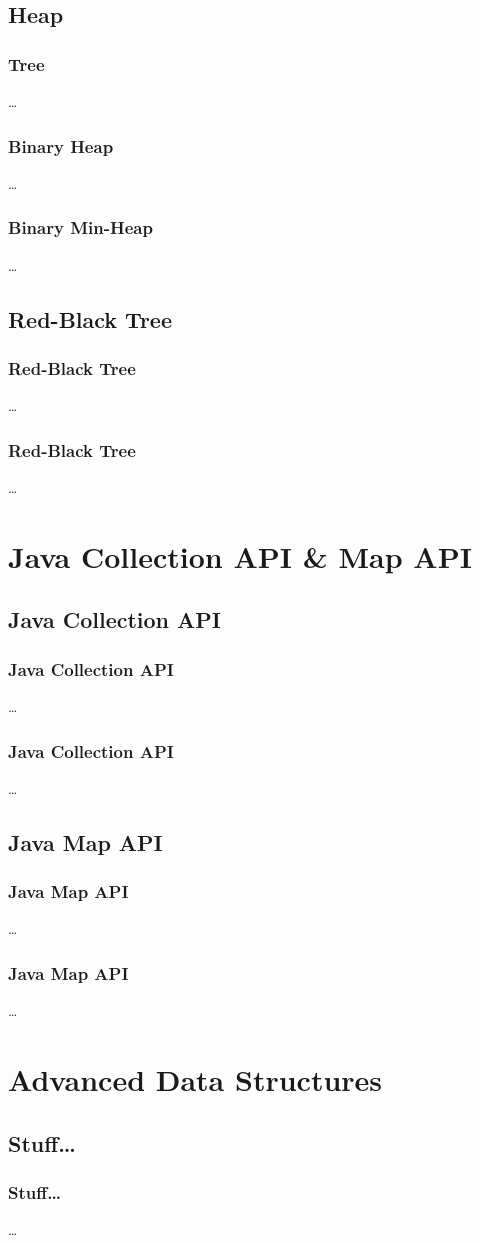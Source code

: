\documentclass{beamer}
\begin{document}
\subsection{Heap}

\begin{frame}
	\frametitle{Tree}
	\ldots
\end{frame}

\begin{frame}
	\frametitle{Binary Heap}
	\ldots
\end{frame}
\begin{frame}
	\frametitle{Binary Min-Heap}
	\ldots
\end{frame}

\subsection{Red-Black Tree}

\begin{frame}
	\frametitle{Red-Black Tree}
	\ldots
\end{frame}
\begin{frame}
	\frametitle{Red-Black Tree}
	\ldots
\end{frame}

\section{Java Collection API \& Map API}

\subsection{Java Collection API}

\begin{frame}
	\frametitle{Java Collection API}
	\ldots
\end{frame}
\begin{frame}
	\frametitle{Java Collection API}
	\ldots
\end{frame}

\subsection{Java Map API}

\begin{frame}
	\frametitle{Java Map API}
	\ldots
\end{frame}
\begin{frame}
	\frametitle{Java Map API}
	\ldots
\end{frame}


\section{Advanced Data Structures}

\subsection{Stuff\ldots}

\begin{frame}
	\frametitle{Stuff\ldots}
	\ldots
\end{frame}
\end{document}
